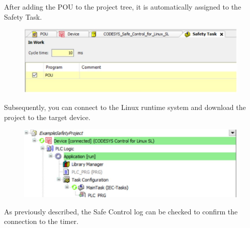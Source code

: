 \documentclass[a4paper,12pt]{article}
\begin{document}
After adding the POU to the project tree, it is automatically assigned to the Safety Task.
\begin{figure}[H]
	\centering
	\includegraphics[width=1\textwidth]{e6.JPG}
\end{figure}
Subsequently, you can connect to the Linux runtime system and download the project to the target device. 
\begin{figure}[H]
	\centering
	\includegraphics[width=1\textwidth]{e7.JPG}
\end{figure}
As previously described, the Safe Control log can be checked to confirm the connection to the timer.
\end{document}
